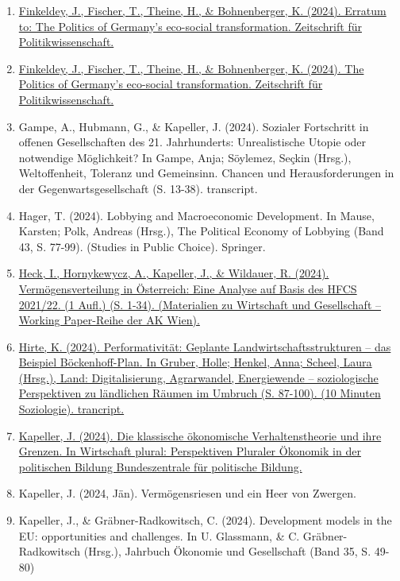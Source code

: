 \begin{enumerate}
	 \item \href{https://doi.org/10.1007/s41358-024-00391-9}{Finkeldey, J., Fischer, T., Theine, H., \& Bohnenberger, K. (2024). Erratum to: The Politics of Germany’s eco-social transformation. Zeitschrift für Politikwissenschaft.}
	 \item \href{https://doi.org/10.1007/s41358-024-00389-3}{Finkeldey, J., Fischer, T., Theine, H., \& Bohnenberger, K. (2024). The Politics of Germany’s eco-social transformation. Zeitschrift für Politikwissenschaft.}
	 \item Gampe, A., Hubmann, G., \& Kapeller, J. (2024). Sozialer Fortschritt in offenen Gesellschaften des 21. Jahrhunderts: Unrealistische Utopie oder notwendige Möglichkeit? In Gampe, Anja; Söylemez, Seçkin (Hrsg.), Weltoffenheit, Toleranz und Gemeinsinn. Chancen und Herausforderungen in der Gegenwartsgesellschaft (S. 13-38). transcript.
	 \item Hager, T. (2024). Lobbying and Macroeconomic Development. In Mause, Karsten; Polk, Andreas (Hrsg.), The Political Economy of Lobbying (Band 43, S. 77-99). (Studies in Public Choice). Springer.
	 \item \href{https://emedien.arbeiterkammer.at/viewer/image/AC17296950/}{Heck, I., Hornykewycz, A., Kapeller, J., \& Wildauer, R. (2024). Vermögensverteilung in Österreich: Eine Analyse auf Basis des HFCS 2021/22. (1 Aufl.) (S. 1-34). (Materialien zu Wirtschaft und Gesellschaft -- Working Paper-Reihe der AK Wien).}
	 \item \href{https://doi.org/10.14361/9783839465233-007}{Hirte, K. (2024). Performativität: Geplante Landwirtschaftsstrukturen – das Beispiel Böckenhoff-Plan. In Gruber, Holle; Henkel, Anna; Scheel, Laura (Hrsg.), Land: Digitalisierung, Agrarwandel, Energiewende – soziologische Perspektiven zu ländlichen Räumen im Umbruch (S. 87-100). (10 Minuten Soziologie). trancript.}
	 \item \href{https://www.bpb.de/system/files/dokument_pdf/TuM_Wirtschaft_plural_Handreichung.pdf}{Kapeller, J. (2024). Die klassische ökonomische Verhaltenstheorie und ihre Grenzen. In Wirtschaft plural: Perspektiven Pluraler Ökonomik in der politischen Bildung Bundeszentrale für politische Bildung.}
	 \item Kapeller, J. (2024, Jän). Vermögensriesen und ein Heer von Zwergen.
	 \item Kapeller, J., \& Gräbner-Radkowitsch, C. (2024). Development models in the EU: opportunities and challenges. In U. Glassmann, \& C. Gräbner-Radkowitsch (Hrsg.), Jahrbuch Ökonomie und Gesellschaft (Band 35, S. 49-80)

\end{enumerate}
